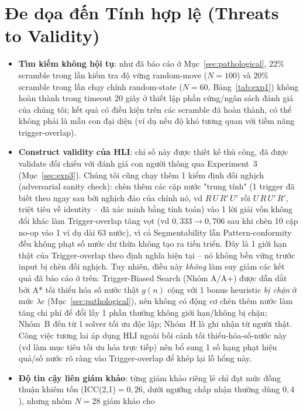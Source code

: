 \documentclass[10pt,conference]{article}
\begin{document}
\section{Đe dọa đến Tính hợp lệ (Threats to Validity)}
\label{sec:threats}
\begin{itemize}
  \item \textbf{Tìm kiếm không hội tụ}: như đã báo cáo ở
    Mục~\ref{sec:pathological}, $22\%$ scramble trong lần kiểm tra độ
    vững random-move ($N=100$) và $20\%$ scramble trong lần chạy
    chính random-state ($N=60$, Bảng~\ref{tab:exp1}) không hoàn thành
    trong timeout 20 giây ở thiết lập phần cứng/ngân sách đánh giá
    của chúng tôi; kết quả có điều kiện trên các scramble đã hoàn
    thành, có thể không phải là mẫu con đại diện (ví dụ nếu độ khó
    tương quan với tiềm năng trigger-overlap).
  \item \textbf{Construct validity của HLI}: chỉ số này được thiết kế
    thủ công, đã được validate đối chiếu với đánh giá con người thông
    qua Experiment~3 (Mục~\ref{sec:exp3}). Chúng tôi cũng chạy thêm 1
    kiểm định đối nghịch (adversarial sanity check): chèn thêm các cặp
    nước "trung tính" (1 trigger đã biết theo ngay sau bởi nghịch đảo
    của chính nó, vd $R\,U\,R'\,U'$ rồi $U\,R\,U'\,R'$, triệt tiêu về
    identity -- đã xác minh bằng tính toán) vào 1 lời giải vốn không
    đổi khác làm Trigger-overlap tăng vọt (vd $0,333 \to 0,706$ sau
    khi chèn 10 cặp no-op vào 1 ví dụ dài 63 nước), vì cả Segmentability
    lẫn Pattern-conformity đều không phạt số nước dư thừa không tạo ra
    tiến triển. Đây là 1 giới hạn thật của Trigger-overlap theo định
    nghĩa hiện tại -- nó không bền vững trước input bị chèn đối
    nghịch. Tuy nhiên, điều này \emph{không} làm suy giảm các kết quả
    đã báo cáo ở trên: Trigger-Biased Search (Nhóm A/A+) được dẫn dắt
    bởi A* tối thiểu hóa số nước thật $g(n)$ cộng với 1 bonus heuristic
    \emph{bị chặn} ở mức $\lambda c$ (Mục~\ref{sec:pathological}), nên
    không có động cơ chèn thêm nước làm tăng chi phí để đổi lấy 1
    phần thưởng không giới hạn/không bị chặn; Nhóm~B đến từ 1 solver
    tối ưu độc lập; Nhóm~H là ghi nhận từ người thật. Công việc tương
    lai áp dụng HLI ngoài bối cảnh tối thiểu-hóa-số-nước này (vd làm
    mục tiêu tối ưu hóa trực tiếp) nên bổ sung 1 số hạng phạt hiệu
    quả/số nước rõ ràng vào Trigger-overlap để khép lại lỗ hổng này.
  \item \textbf{Độ tin cậy liên giám khảo}: từng giám khảo riêng lẻ
    chỉ đạt mức đồng thuận khiêm tốn (ICC(2,1)$=0,26$, dưới ngưỡng
    chấp nhận thường dùng $0,4$), nhưng nhóm $N=28$ giám khảo cho

\end{itemize}
\end{document}
